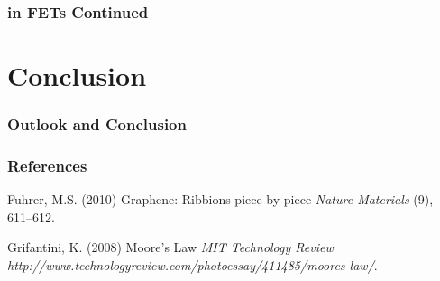 \documentclass{beamer}
\begin{document}
\begin{frame}
\frametitle{ in FETs Continued}
\end{frame}

\section{Conclusion}
\begin{frame}
\frametitle{Outlook and Conclusion}
\end{frame}

\begin{frame}
\frametitle{References}
\footnotesize{
	\begin{thebibliography}{99}
	 Fuhrer, M.S. (2010)
	\newblock  Graphene: Ribbions piece-by-piece
	\newblock \emph{Nature Materials} (9), 611--612.

	 Grifantini, K. (2008)
	\newblock Moore's Law
	\newblock \emph{MIT Technology Review} \emph{http://www.technologyreview.com/photoessay/411485/moores-law/}.

	\end{thebibliography}
}
\end{frame}

\end{document}
